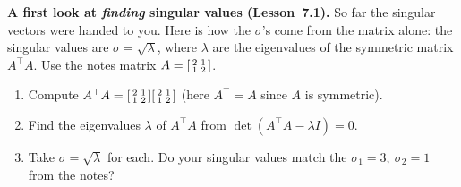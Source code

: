 \documentclass[10pt]{article}
\newcommand{\T}{^{\top}}
\begin{document}
\begin{tcolorbox}[colback=white, colframe=black!40, title=\textbf{Tier E --- Extension},
    fonttitle=\bfseries, arc=1.5mm, left=3mm, right=3mm, top=2mm, bottom=2mm, breakable]
\textbf{A first look at \emph{finding} singular values (Lesson~7.1).} So far the singular vectors were
handed to you. Here is how the $\sigma$'s come from the matrix alone: the singular values are
$\sigma=\sqrt{\lambda}$, where $\lambda$ are the eigenvalues of the symmetric matrix $A\T A$. Use the
notes matrix $A=\begin{bsmallmatrix} 2 & 1\\ 1 & 2 \end{bsmallmatrix}$.
\begin{enumerate}[leftmargin=1.7em, itemsep=9pt]
  \item Compute $A\T A=\begin{bsmallmatrix} 2 & 1\\ 1 & 2 \end{bsmallmatrix}\begin{bsmallmatrix} 2 & 1\\ 1 & 2 \end{bsmallmatrix}$ (here $A\T=A$ since $A$ is symmetric). 
  \item Find the eigenvalues $\lambda$ of $A\T A$ from $\det(A\T A-\lambda I)=0$. 
  \item Take $\sigma=\sqrt{\lambda}$ for each. Do your singular values match the $\sigma_1=3,\ \sigma_2=1$
        from the notes? \writeline
\end{enumerate}
\end{tcolorbox}
\end{document}
